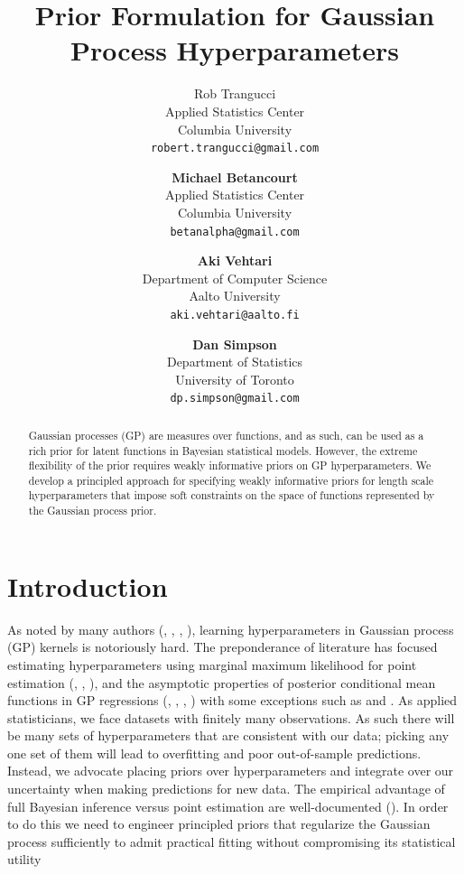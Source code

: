 \documentclass{article}
\title{Prior Formulation for Gaussian Process Hyperparameters}
\author{
  Rob Trangucci \\
  Applied Statistics Center\\
  Columbia University\\
  \texttt{robert.trangucci@gmail.com} 
  \and
  \textbf{Michael Betancourt} \\
  Applied Statistics Center \\
  Columbia University \\
  \texttt{betanalpha@gmail.com} 
  \and
  \textbf{Aki Vehtari} \\
  Department of Computer Science \\
  Aalto University \\
  \texttt{aki.vehtari@aalto.fi} 
  \and
  \textbf{Dan Simpson} \\
  Department of Statistics \\
  University of Toronto \\
  \texttt{dp.simpson@gmail.com} 
}
\begin{document}

\maketitle

\begin{abstract}
  Gaussian processes (GP) are measures over functions, and as such, can be used
  as a rich prior for latent functions in Bayesian statistical models. However,
  the extreme flexibility of the prior requires weakly informative priors on GP
  hyperparameters. We develop a principled approach for specifying weakly
  informative priors for length scale hyperparameters that impose soft
  constraints on the space of functions represented by the Gaussian process
  prior.
\end{abstract}


\section{Introduction}

As noted by many authors (\citet{flaxman2015fast},
\citet{stein2012interpolation}, \citet{rasmussen2005gaussian},
\citet{fuglstad2015interpretable}), learning hyperparameters in Gaussian
process (GP) kernels is notoriously hard. The preponderance of literature has
focused estimating hyperparameters using marginal maximum likelihood for point
estimation (\citet{stein2012interpolation}, \citet{rasmussen2005gaussian},
\citet{warnes1987problems}), and the asymptotic properties of posterior
conditional mean functions in GP regressions (\citet{seeger2008information},
\citet{stein2012interpolation}, \citet{rasmussen2005gaussian},
\citet{williams2000upper}) with some exceptions such as
\citet{neal1998regression} and \citet{vanhatalo2013gpstuff}. As applied
statisticians, we face datasets with finitely many observations. As such there
will be many sets of hyperparameters that are consistent with our data; picking
any one set of them will lead to overfitting and poor out-of-sample
predictions. Instead, we advocate placing priors over hyperparameters and
integrate over our uncertainty when making predictions for new data. The
empirical advantage of full Bayesian inference versus point estimation are
well-documented (\citet{vehtariloo}).  In order to do this we need to engineer
principled priors that regularize the Gaussian process sufficiently to admit
practical fitting without compromising its statistical utility
\end{document}
